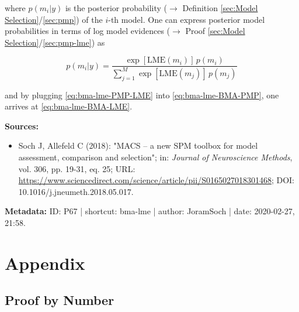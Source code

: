 \documentclass[a4paper,12pt,twoside]{book}
\begin{document}
where $p(m_i \vert y)$ is the posterior probability ($\rightarrow$ Definition \ref{sec:Model Selection}/\ref{sec:pmp}) of the $i$-th model. One can express posterior model probabilities in terms of log model evidences ($\rightarrow$ Proof \ref{sec:Model Selection}/\ref{sec:pmp-lme}) as

\begin{equation} \label{eq:bma-lme-PMP-LME}
p(m_i|y) = \frac{\exp[\mathrm{LME}(m_i)] \, p(m_i)}{\sum_{j=1}^{M} \exp[\mathrm{LME}(m_j)] \, p(m_j)}
\end{equation}

and by plugging \eqref{eq:bma-lme-PMP-LME} into \eqref{eq:bma-lme-BMA-PMP}, one arrives at \eqref{eq:bma-lme-BMA-LME}.


\vspace{1em}
\textbf{Sources:}
\begin{itemize}
\item Soch J, Allefeld C (2018): "MACS – a new SPM toolbox for model assessment, comparison and selection"; in: \textit{Journal of Neuroscience Methods}, vol. 306, pp. 19-31, eq. 25; URL: \url{https://www.sciencedirect.com/science/article/pii/S0165027018301468}; DOI: 10.1016/j.jneumeth.2018.05.017.
\end{itemize}


\vspace{1em}
\textbf{Metadata:} ID: P67 | shortcut: bma-lme | author: JoramSoch | date: 2020-02-27, 21:58.
\vspace{1em}



\chapter{Appendix} \label{sec:Appendix} \newpage

\pagebreak
\section{Proof by Number}
\end{document}
